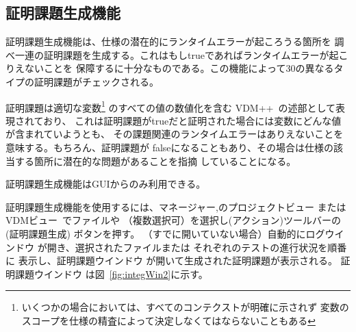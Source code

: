 \documentclass[\pformat,12pt]{jarticle}
\newcommand{\vdmslpp}{VDM++}
\newcommand{\vdmModView}{\guicmd{VDMビュー}}
\newcommand{\guicmd}[1]{{\gt #1}}
\begin{document}



\newpage
\subsection{証明課題生成機能}\label{sec:pog}


証明課題生成機能は、仕様の潜在的にランタイムエラーが起ころうる箇所を
調べ一連の証明課題を生成する。これはもしtrueであればランタイムエラーが起こりえないことを
保障するに十分なものである。この機能によって30の異なるタイプの証明課題がチェックされる。

証明課題は適切な変数\footnote{いくつかの場合においては、すべてのコンテクストが明確に示されず
  変数のスコープを仕様の精査によって決定しなくてはならないこともある} のすべての値の数値化を含む
\vdmslpp\ の述部として表現されており、
これは証明課題がtrueだと証明された場合には変数にどんな値が含まれていようとも、
その課題関連のランタイムエラーはありえないことを意味する。もちろん、証明課題が
falseになることもあり、その場合は仕様の該当する箇所に潜在的な問題があることを指摘
していることになる。

証明課題生成機能はGUIからのみ利用できる。

証明課題生成機能を使用するには、\guicmd{マネージャー},の\guicmd{プロジェクトビュー} または
\vdmModView\ でファイルや
 （複数選択可）を選択し(\guicmd{アクション})ツールバーの 
(\guicmd{証明課題生成}) ボタンを押す。 （すでに開いていない場合）自動的に\guicmd{ログウインドウ} 
が開き、選択されたファイルまたは
 それぞれのテストの進行状況を順番に
表示し、\guicmd{証明課題ウインドウ} が開いて生成された証明課題が表示される。
\guicmd{証明課題ウインドウ} は図~\ref{fig:integWin2}に示す。
\end{document}
